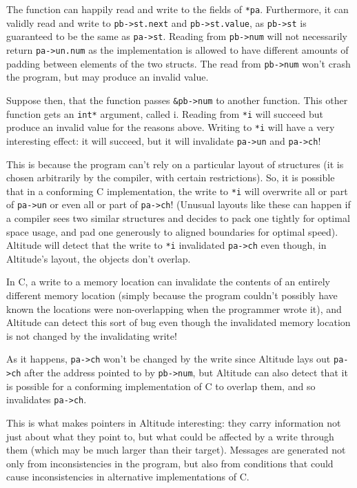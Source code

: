 \documentclass[10pt,a4paper]{report}
\begin{document}
The function can happily read and write to the fields of \lstinline{*pa}. Furthermore, it can validly read and write to \lstinline{pb->st.next} and \lstinline{pb->st.value}, as \lstinline{pb->st} is guaranteed to be the same as \lstinline{pa->st}. Reading from \lstinline{pb->num} will not necessarily return \lstinline{pa->un.num} as the implementation is allowed to have different amounts of padding between elements of the two structs. The read from \lstinline{pb->num} won't crash the program, but may produce an invalid value.

Suppose then, that the function passes \lstinline{&pb->num} to another function. This other function gets an \lstinline{int*} argument, called i. Reading from \lstinline{*i} will succeed but produce an invalid value for the reasons above. Writing to \lstinline{*i} will have a very interesting effect: it will succeed, but it will invalidate \lstinline{pa->un} and \lstinline{pa->ch}!

This is because the program can't rely on a particular layout of structures (it is chosen arbitrarily by the compiler, with certain restrictions). So, it is possible that in a conforming C implementation, the write to \lstinline{*i} will overwrite all or part of \lstinline{pa->un} or even all or part of \lstinline{pa->ch}! (Unusual layouts like these can happen if a compiler sees two similar structures and decides to pack one tightly for optimal space usage, and pad one generously to aligned boundaries for optimal speed). Altitude will detect that the write to \lstinline{*i} invalidated \lstinline{pa->ch} even though, in Altitude's layout, the objects don't overlap.

In C, a write to a memory location can invalidate the contents of an entirely different memory location (simply because the program couldn't possibly have known the locations were non-overlapping when the programmer wrote it), and Altitude can detect this sort of bug even though the invalidated memory location is not changed by the invalidating write!

As it happens, \lstinline{pa->ch} won't be changed by the write since Altitude lays out \lstinline{pa->ch} after the address pointed to by \lstinline{pb->num}, but Altitude can also detect that it is possible for a conforming implementation of C to overlap them, and so invalidates \lstinline{pa->ch}.

This is what makes pointers in Altitude interesting: they carry information not just about what they point to, but what could be affected by a write through them (which may be much larger than their target). Messages are generated not only from inconsistencies in the program, but also from conditions that could cause inconsistencies in alternative implementations of C.
\end{document}

